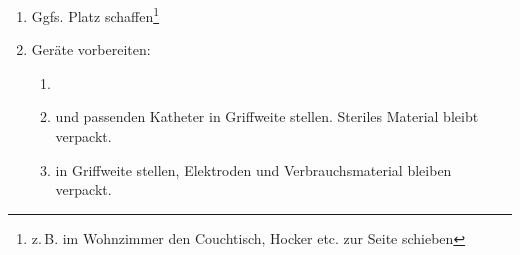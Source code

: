 \label{m:reanimationsbereitschaft}
\begin{enumerate}
  \item Ggfs. Platz schaffen\footnote{z.\,B. im Wohnzimmer den Couchtisch, Hocker etc. zur Seite schieben}
  \item Geräte vorbereiten:
\begin{enumerate}
    \item {}
    \item {} und passenden Katheter  in
    Griffweite stellen. Steriles Material bleibt verpackt.
    \item {} in Griffweite stellen,
    Elektroden und Verbrauchsmaterial bleiben verpackt.
  \end{enumerate}
\end{enumerate}